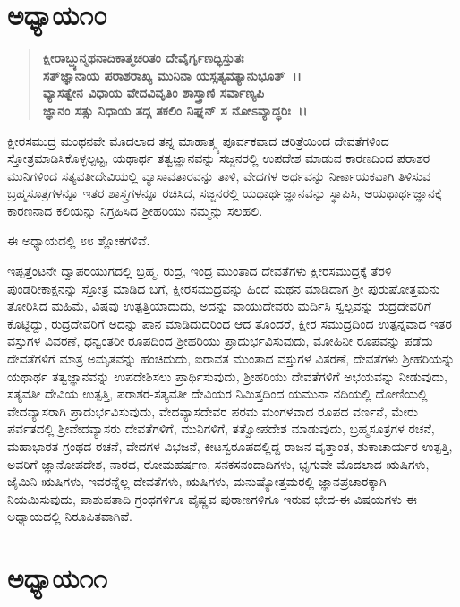 \section*{ಅಧ್ಯಾಯ\enginline{-}೧೦}

\begin{verse}
\textbf{ಕ್ಷೀರಾಬ್ದ್ಯುನ್ಮಥನಾದಿಕಾತ್ಮಚರಿತಂ ದೇವೈರ್ಗೃಣದ್ಭಿಸ್ತುತಃ }\\\textbf{ಸತ್‌ಜ್ಞಾನಾಯ ಪರಾಶರಾಖ್ಯ ಮುನಿನಾ ಯಸ್ಸತ್ಯವತ್ಯಾನುಭೂತ್~।।} \\\textbf{ವ್ಯಾಸತ್ವೇನ ವಿಧಾಯ ವೇದವಿವೃತಿಂ ಶಾಸ್ತ್ರಾಣಿ ಸರ್ವಾಣ್ಯಪಿ}\\\textbf{ಜ್ಞಾನಂ ಸತ್ಸು ನಿಧಾಯ ತದ್ಗ ತಕಲಿಂ ನಿಘ್ನನ್ ಸ ನೋಽವ್ಯಾದ್ಧರಿಃ~।।}
\end{verse}

\vskip -1pt

ಕ್ಷೀರಸಮುದ್ರ ಮಂಥನವೇ ಮೊದಲಾದ ತನ್ನ ಮಾಹಾತ್ಮ್ಯ ಪೂರ್ವಕವಾದ ಚರಿತ್ರೆಯಿಂದ ದೇವತೆಗಳಿಂದ ಸ್ತೋತ್ರಮಾಡಿಸಿಕೊಳ್ಳಲ್ಪಟ್ಟ, ಯಥಾರ್ಥ ತತ್ವಜ್ಞಾನವನ್ನು ಸಜ್ಜನರಲ್ಲಿ ಉಪದೇಶ ಮಾಡುವ ಕಾರಣದಿಂದ ಪರಾಶರ ಮುನಿಗಳಿಂದ ಸತ್ಯವತೀದೇವಿಯಲ್ಲಿ ವ್ಯಾಸಾವತಾರವನ್ನು ತಾಳಿ, ವೇದಗಳ ಅರ್ಥವನ್ನು ನಿರ್ಣಾಯಕವಾಗಿ ತಿಳಿಸುವ ಬ್ರಹ್ಮಸೂತ್ರಗಳನ್ನೂ ಇತರ ಶಾಸ್ತ್ರಗಳನ್ನೂ ರಚಿಸಿದ, ಸಜ್ಜನರಲ್ಲಿ ಯಥಾರ್ಥಜ್ಞಾನವನ್ನು ಸ್ಥಾಪಿಸಿ, ಅಯಥಾರ್ಥಜ್ಞಾನಕ್ಕೆ ಕಾರಣನಾದ ಕಲಿಯನ್ನು ನಿಗ್ರಹಿಸಿದ ಶ‍್ರೀಹರಿಯು ನಮ್ಮನ್ನು ಸಲಹಲಿ.

ಈ ಅಧ್ಯಾಯದಲ್ಲಿ ೮೮ ಶ್ಲೋಕಗಳಿವೆ.

ಇಪ್ಪತ್ತೆಂಟನೇ ದ್ವಾಪರಯುಗದಲ್ಲಿ ಬ್ರಹ್ಮ, ರುದ್ರ, ಇಂದ್ರ ಮುಂತಾದ ದೇವತೆಗಳು ಕ್ಷೀರಸಮುದ್ರಕ್ಕೆ ತೆರಳಿ ಪುಂಡರೀಕಾಕ್ಷನನ್ನು ಸ್ತೋತ್ರ ಮಾಡಿದ ಬಗೆ, ಕ್ಷೀರಸಮುದ್ರವನ್ನು ಹಿಂದೆ ಮಥನ ಮಾಡಿದಾಗ ಶ‍್ರೀ ಪುರುಷೋತ್ತಮನು ತೋರಿಸಿದ ಮಹಿಮೆ, ವಿಷವು ಉತ್ಪತ್ತಿ\-ಯಾದುದು, ಅದನ್ನು ವಾಯುದೇವರು ಮರ್ದಿಸಿ ಸ್ವಲ್ಪವನ್ನು ರುದ್ರದೇವರಿಗೆ ಕೊಟ್ಟಿದ್ದು, ರುದ್ರದೇವರಿಗೆ ಅದನ್ನು ಪಾನ ಮಾಡಿದುದರಿಂದ ಆದ ತೊಂದರೆ, ಕ್ಷೀರ ಸಮುದ್ರದಿಂದ ಉತ್ಪನ್ನವಾದ ಇತರ ವಸ್ತುಗಳ ವಿವರಣೆ, ಧನ್ವಂತರೀ ರೂಪದಿಂದ ಶ‍್ರೀಹರಿಯು ಪ್ರಾದುರ್ಭವಿಸುವುದು, ಮೋಹಿನೀ ರೂಪವನ್ನು ಪಡೆದು ದೇವತೆಗಳಿಗೆ ಮಾತ್ರ ಅಮೃತವನ್ನು ಹಂಚಿದುದು, ಐರಾವತ ಮುಂತಾದ ವಸ್ತುಗಳ ವಿತರಣೆ, ದೇವತೆಗಳು ಶ‍್ರೀಹರಿಯನ್ನು ಯಥಾರ್ಥ ತತ್ವಜ್ಞಾನವನ್ನು ಉಪದೇಶಿಸಲು ಪ್ರಾರ್ಥಿಸುವುದು, ಶ‍್ರೀಹರಿಯು ದೇವತೆಗಳಿಗೆ ಅಭಯವನ್ನು ನೀಡುವುದು, ಸತ್ಯವತೀ ದೇವಿಯ ಉತ್ಪತ್ತಿ, ಪರಾಶರ-ಸತ್ಯವತೀ ದೇವಿಯರ ನಿಮಿತ್ತದಿಂದ ಯಮುನಾ ನದಿಯಲ್ಲಿ ದೋಣಿಯಲ್ಲಿ ವೇದವ್ಯಾಸರಾಗಿ ಪ್ರಾದುರ್ಭವಿಸುವುದು, ವೇದವ್ಯಾಸದೇವರ ಪರಮ ಮಂಗಳವಾದ ರೂಪದ ವರ್ಣನೆ, ಮೇರು ಪರ್ವತದಲ್ಲಿ ಶ‍್ರೀವೇದವ್ಯಾಸರು ದೇವತೆಗಳಿಗೆ, ಮುನಿಗಳಿಗೆ, ತತ್ವೋಪದೇಶ ಮಾಡುವುದು, ಬ್ರಹ್ಮಸೂತ್ರಗಳ ರಚನೆ, ಮಹಾಭಾರತ ಗ್ರಂಥದ ರಚನೆ, ವೇದಗಳ ವಿಭಜನೆ, ಕೀಟಸ್ವರೂಪದಲ್ಲಿದ್ದ ರಾಜನ ವೃತ್ತಾಂತ, ಶುಕಾಚಾರ್ಯರ ಉತ್ಪತ್ತಿ, ಅವರಿಗೆ ಜ್ಞಾನೋಪದೇಶ, ನಾರದ, ರೋಮಹರ್ಷಣ, ಸನಕಸನಂದಾದಿಗಳು, ಭೃಗುವೇ ಮೊದಲಾದ ಋಷಿಗಳು, ಜೈಮಿನಿ ಋಷಿಗಳು, ಇವರನ್ನೆಲ್ಲ ದೇವತೆಗಳು, ಋಷಿಗಳು, ಮನುಷ್ಯೋತ್ತಮರಲ್ಲಿ ಜ್ಞಾನಪ್ರಚಾರಕ್ಕಾಗಿ ನಿಯಮಿಸುವುದು, ಪಾಶುಪತಾದಿ ಗ್ರಂಥಗಳಿಗೂ ವೈಷ್ಣವ ಪುರಾಣಗಳಿಗೂ ಇರುವ ಭೇದ-ಈ ವಿಷಯಗಳು ಈ ಅಧ್ಯಾಯದಲ್ಲಿ ನಿರೂಪಿತವಾಗಿವೆ.


\section*{ಅಧ್ಯಾಯ\enginline{-}೧೧}

